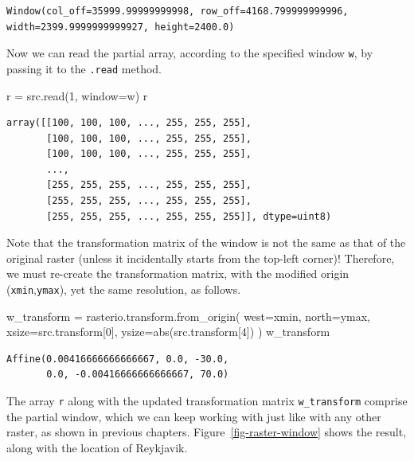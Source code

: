 \documentclass[
  letterpaper,
]{krantz}
\newenvironment{Shaded}{\begin{snugshade}}{\end{snugshade}}
\newcommand{\BuiltInTok}[1]{\textcolor[rgb]{0.00,0.23,0.31}{#1}}
\newcommand{\DecValTok}[1]{\textcolor[rgb]{0.68,0.00,0.00}{#1}}
\newcommand{\NormalTok}[1]{\textcolor[rgb]{0.00,0.23,0.31}{#1}}
\newcommand{\OperatorTok}[1]{\textcolor[rgb]{0.37,0.37,0.37}{#1}}
\begin{document}
\begin{verbatim}
Window(col_off=35999.99999999998, row_off=4168.799999999996, width=2399.9999999999927, height=2400.0)
\end{verbatim}

Now we can read the partial array, according to the specified window
\texttt{w}, by passing it to the \texttt{.read} method.

\begin{Shaded}
\begin{Highlighting}[]
\NormalTok{r }\OperatorTok{=}\NormalTok{ src.read(}\DecValTok{1}\NormalTok{, window}\OperatorTok{=}\NormalTok{w)}
\NormalTok{r}
\end{Highlighting}
\end{Shaded}

\begin{verbatim}
array([[100, 100, 100, ..., 255, 255, 255],
       [100, 100, 100, ..., 255, 255, 255],
       [100, 100, 100, ..., 255, 255, 255],
       ...,
       [255, 255, 255, ..., 255, 255, 255],
       [255, 255, 255, ..., 255, 255, 255],
       [255, 255, 255, ..., 255, 255, 255]], dtype=uint8)
\end{verbatim}

Note that the transformation matrix of the window is not the same as
that of the original raster (unless it incidentally starts from the
top-left corner)! Therefore, we must re-create the transformation
matrix, with the modified origin (\texttt{xmin},\texttt{ymax}), yet the
same resolution, as follows.

\begin{Shaded}
\begin{Highlighting}[]
\NormalTok{w\_transform }\OperatorTok{=}\NormalTok{ rasterio.transform.from\_origin(}
\NormalTok{    west}\OperatorTok{=}\NormalTok{xmin, }
\NormalTok{    north}\OperatorTok{=}\NormalTok{ymax, }
\NormalTok{    xsize}\OperatorTok{=}\NormalTok{src.transform[}\DecValTok{0}\NormalTok{],}
\NormalTok{    ysize}\OperatorTok{=}\BuiltInTok{abs}\NormalTok{(src.transform[}\DecValTok{4}\NormalTok{])}
\NormalTok{)}
\NormalTok{w\_transform}
\end{Highlighting}
\end{Shaded}

\begin{verbatim}
Affine(0.00416666666666667, 0.0, -30.0,
       0.0, -0.00416666666666667, 70.0)
\end{verbatim}

The array \texttt{r} along with the updated transformation matrix
\texttt{w\_transform} comprise the partial window, which we can keep
working with just like with any other raster, as shown in previous
chapters. Figure~\ref{fig-raster-window} shows the result, along with
the location of Reykjavik.
\end{document}
